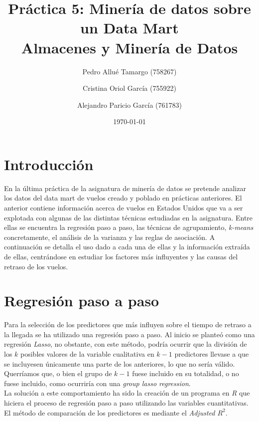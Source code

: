 \documentclass{article}
\begin{document}
\begin{titlepage}
\title{\textbf{
    {\Huge Práctica 5: Minería de datos sobre un Data Mart}\\
    {\Large Almacenes y Minería de Datos}
}}
\author{
    Pedro Allué Tamargo (758267)
    \and
    Cristina Oriol García (755922)
    \and
    Alejandro Paricio García (761783)
}
\date{\today}
\clearpage\maketitle
\end{titlepage}

\tableofcontents

\newpage
\section{Introducción}

En la última práctica de la asignatura de minería de datos se pretende analizar los datos del data mart de vuelos creado y poblado en prácticas anteriores. El anterior contiene información acerca de vuelos en Estados Unidos que va a ser explotada con algunas de las distintas técnicas estudiadas en la asignatura. Entre ellas se encuentra la regresión paso a paso, las técnicas de agrupamiento, \textit{k-means} concretamente, el análisis de la varianza y las reglas de asociación. A continuación se detalla el uso dado a cada una de ellas y la información extraída de ellas, centrándose en estudiar los factores más influyentes y las causas del retraso de los vuelos.\\


\section{Regresión paso a paso}
\label{section:regPasoPaso}

Para la selección de los predictores que más influyen sobre el tiempo de retraso a la llegada se ha utilizado una regresión paso a paso. Al inicio se planteó como una regresión \textit{Lasso}, no obstante, con este método, podría ocurrir que la división de los $k$ posibles valores de la variable cualitativa en $k-1$ predictores llevase a que se incluyesen únicamente una parte de los anteriores, lo que no sería válido. Querríamos que, o bien el grupo de $k-1$ fuese incluido en su totalidad, o no fuese incluido, como ocurriría con una \textit{group lasso regression}.\\
La solución a este comportamiento ha sido la creación de un programa en \textit{R} que hiciera el proceso de regresión paso a paso utilizando las variables cuantitativas. El método de comparación de los predictores es mediante el \textit{Adjusted $R^2$}.\\
\end{document}
